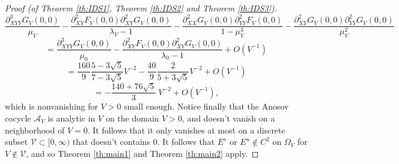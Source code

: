 \documentclass[10pt,a4paper]{amsart}
\begin{document}
\begin{proof}[Proof (of Theorem \ref{th:IDS1}, Theorem \ref{th:IDS2} and Theorem \ref{th:IDS3})]
$$ \frac{\partial^3_{XYY} G_V(0,0)}{\mu_V} - \frac{\partial_{XY}^2 F_V(0,0) \partial_{XY}^2 G_V(0,0)}{\lambda_V-1} - \frac{\partial_{XX}^2 G_V(0,0) \partial_{YY}^2 F_V(0,0)}{1-\mu_V^3} - \frac{\partial_{XY}^2 G_V(0,0) \partial_{YY}^2 G_V(0,0)}{\mu_V^2}  $$
$$ = \frac{\partial^3_{XYY} G_V(0,0)}{\mu_0} - \frac{\partial_{XY}^2 F_V(0,0) \partial_{XY}^2 G_V(0,0)}{\lambda_0-1} + O(V^{-1}) $$
$$ =  \frac{160}{9}\frac{5-3\sqrt{5}}{7-3\sqrt{5}} V^{-2} - \frac{40}{9} \frac{2}{5+3\sqrt{5}} V^{-2} + O(V^{-1}) $$
$$ = - \frac{140+76\sqrt{5}}{3} \ V^{-2} + O(V^{-1}), $$
which is nonvanishing for $V>0$ small enough. Notice finally that the Anosov cocycle $\mathcal{A}_V$ is analytic in $V$ on the domain $V>0$, and doesn't vanish on a neighborhood of $V=0$. It follows that it only vanishes at most on a discrete subset $\mathcal{V} \subset [0,\infty)$ that doesn't contains $0$. It follows that $E^s \text{ or } E^u \notin C^2$ on $\Omega_V$ for $V \notin \mathcal{V}$, and so Theorem \ref{th:main1} and Theorem \ref{th:main2} apply. \end{proof}
\end{document}

